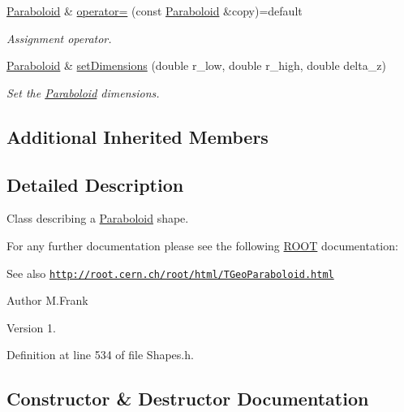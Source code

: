 \begin{DoxyCompactItemize}
\hyperlink{class_d_d4hep_1_1_geometry_1_1_paraboloid}{Paraboloid} \& \hyperlink{class_d_d4hep_1_1_geometry_1_1_paraboloid_a981fe7239f96a7dc0ced368d64daa51b}{operator=} (const \hyperlink{class_d_d4hep_1_1_geometry_1_1_paraboloid}{Paraboloid} \&copy)=default
\begin{DoxyCompactList}\small\item\em Assignment operator. \end{DoxyCompactList}\item 
\hyperlink{class_d_d4hep_1_1_geometry_1_1_paraboloid}{Paraboloid} \& \hyperlink{class_d_d4hep_1_1_geometry_1_1_paraboloid_ac05a503afc384dfc0fc882465e9e43df}{set\+Dimensions} (double r\+\_\+low, double r\+\_\+high, double delta\+\_\+z)
\begin{DoxyCompactList}\small\item\em Set the \hyperlink{class_d_d4hep_1_1_geometry_1_1_paraboloid}{Paraboloid} dimensions. \end{DoxyCompactList}\end{DoxyCompactItemize}
\subsection*{Additional Inherited Members}


\subsection{Detailed Description}
Class describing a \hyperlink{class_d_d4hep_1_1_geometry_1_1_paraboloid}{Paraboloid} shape. 

For any further documentation please see the following \hyperlink{namespace_r_o_o_t}{R\+O\+OT} documentation\+: \begin{DoxySeeAlso}{See also}
\href{http://root.cern.ch/root/html/TGeoParaboloid.html}{\tt http\+://root.\+cern.\+ch/root/html/\+T\+Geo\+Paraboloid.\+html}
\end{DoxySeeAlso}
\begin{DoxyAuthor}{Author}
M.\+Frank 
\end{DoxyAuthor}
\begin{DoxyVersion}{Version}
1. 
\end{DoxyVersion}


Definition at line 534 of file Shapes.\+h.



\subsection{Constructor \& Destructor Documentation}
\hypertarget{class_d_d4hep_1_1_geometry_1_1_paraboloid_ad82197282fd43403bb5c6d797cddac5f}{}\label{class_d_d4hep_1_1_geometry_1_1_paraboloid_ad82197282fd43403bb5c6d797cddac5f} 

